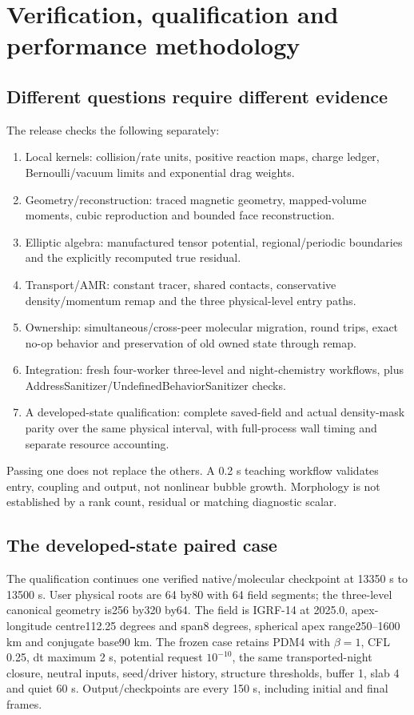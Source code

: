 \section{Verification, qualification and performance methodology}
\subsection{Different questions require different evidence}
The release checks the following separately:
\begin{enumerate}
\item Local kernels: collision/rate units, positive reaction maps, charge
 ledger, Bernoulli/vacuum limits and exponential drag weights.
\item Geometry/reconstruction: traced magnetic geometry, mapped-volume
 moments, cubic reproduction and bounded face reconstruction.
\item Elliptic algebra: manufactured tensor potential, regional/periodic
 boundaries and the explicitly recomputed true residual.
\item Transport/AMR: constant tracer, shared contacts, conservative
 density/momentum remap and the three physical-level entry paths.
\item Ownership: simultaneous/cross-peer molecular migration, round trips,
 exact no-op behavior and preservation of old owned state through remap.
\item Integration: fresh four-worker three-level and night-chemistry
 workflows, plus AddressSanitizer/UndefinedBehaviorSanitizer checks.
\item A developed-state qualification: complete saved-field and actual
 density-mask parity over the same physical interval, with full-process
 wall timing and separate resource accounting.
\end{enumerate}
Passing one does not replace the others. A 0.2 s teaching workflow validates
entry, coupling and output, not nonlinear bubble growth. Morphology is not
established by a rank count, residual or matching diagnostic scalar.

\subsection{The developed-state paired case}
The qualification continues one verified native/molecular checkpoint at
13350 s to 13500 s. User physical roots are 64 by80 with 64 field segments;
the three-level canonical geometry is256 by320 by64. The field is IGRF-14
at 2025.0, apex-longitude centre112.25 degrees and span8 degrees, spherical
apex range250--1600 km and conjugate base90 km. The frozen case retains
PDM4 with $\beta=1$, CFL 0.25, dt maximum 2 s, potential request $10^{-10}$,
the same transported-night closure, neutral inputs, seed/driver history,
structure thresholds, buffer 1, slab 4 and quiet 60 s. Output/checkpoints are
every 150 s, including initial and final frames.

